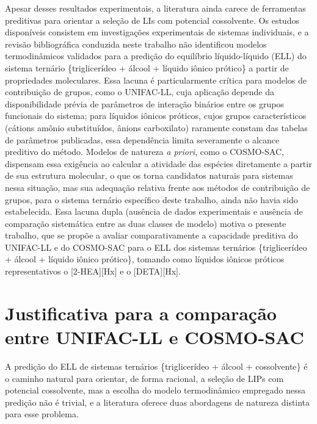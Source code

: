 Apesar desses resultados experimentais, a literatura ainda carece de ferramentas preditivas para orientar a seleção de LIs com potencial cossolvente. Os estudos disponíveis consistem em investigações experimentais de sistemas individuais, e a revisão bibliográfica conduzida neste trabalho não identificou modelos termodinâmicos validados para a predição do equilíbrio líquido-líquido (ELL) do sistema ternário \{triglicerídeo + álcool + líquido iônico prótico\} a partir de propriedades moleculares. Essa lacuna é particularmente crítica para modelos de contribuição de grupos, como o UNIFAC-LL, cuja aplicação depende da disponibilidade prévia de parâmetros de interação binários entre os grupos funcionais do sistema; para líquidos iônicos próticos, cujos grupos característicos (cátions amônio substituídos, ânions carboxilato) raramente constam das tabelas de parâmetros publicadas, essa dependência limita severamente o alcance preditivo do método. Modelos de natureza \textit{a priori}, como o COSMO-SAC, dispensam essa exigência ao calcular a atividade das espécies diretamente a partir de sua estrutura molecular, o que os torna candidatos naturais para sistemas nessa situação, mas sua adequação relativa frente aos métodos de contribuição de grupos, para o sistema ternário específico deste trabalho, ainda não havia sido estabelecida. Essa lacuna dupla (ausência de dados experimentais e ausência de comparação sistemática entre as duas classes de modelo) motiva o presente trabalho, que se propõe a avaliar comparativamente a capacidade preditiva do UNIFAC-LL e do COSMO-SAC para o ELL dos sistemas ternários \{triglicerídeo + álcool + líquido iônico prótico\}, tomando como líquidos iônicos próticos representativos o [2-HEA][Hx] e o [DETA][Hx].
\section{Justificativa para a comparação entre UNIFAC-LL e COSMO-SAC}

A predição do ELL de sistemas ternários \{triglicerídeo + álcool + cossolvente\} é o caminho natural para orientar, de forma racional, a seleção de LIPs com potencial cossolvente, mas a escolha do modelo termodinâmico empregado nessa predição não é trivial, e a literatura oferece duas abordagens de natureza distinta para esse problema.

